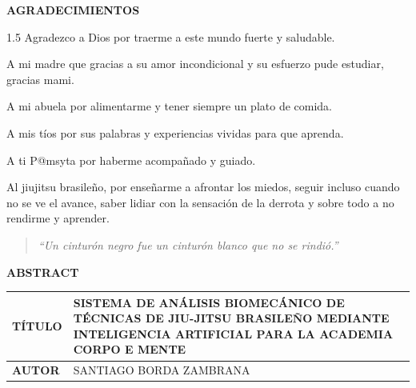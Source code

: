 \documentclass[12pt,letterpaper]{article}
\begin{document}
\clearpage

\thispagestyle{empty}
\null
\clearpage

\thispagestyle{empty}
\begin{center}
    {\bfseries\Large AGRADECIMIENTOS \par}
\end{center}

\vspace{1.5cm}

\begin{spacing}{1.5}
Agradezco a Dios por traerme a este mundo fuerte y saludable.

A mi madre que gracias a su amor incondicional y su esfuerzo pude estudiar, gracias mami.

A mi abuela por alimentarme y tener siempre un plato de comida.

A mis tíos por sus palabras y experiencias vividas para que aprenda.

A ti P@msyta por haberme acompañado y guiado.

Al jiujitsu brasileño, por enseñarme a afrontar los miedos, seguir incluso cuando no se ve el avance, saber lidiar con la sensación de la derrota y sobre todo a no rendirme y aprender.

\vspace{1cm}
\begin{quote}
\centering
\textit{“Un cinturón negro fue un cinturón blanco que no se rindió.”}
\end{quote}
\end{spacing}

\clearpage

\thispagestyle{empty}
\begin{center}
    {\bfseries\large ABSTRACT \par}
\end{center}

\vspace{0.5cm}

\noindent
\begin{tabularx}{\textwidth}{|>{\bfseries}l|X|}
    \hline
    TÍTULO & SISTEMA DE ANÁLISIS BIOMECÁNICO DE TÉCNICAS DE JIU-JITSU BRASILEÑO MEDIANTE INTELIGENCIA ARTIFICIAL PARA LA ACADEMIA CORPO E MENTE \\ \hline
    AUTOR & SANTIAGO BORDA ZAMBRANA \\ \hline
\end{tabularx}
\end{document}
